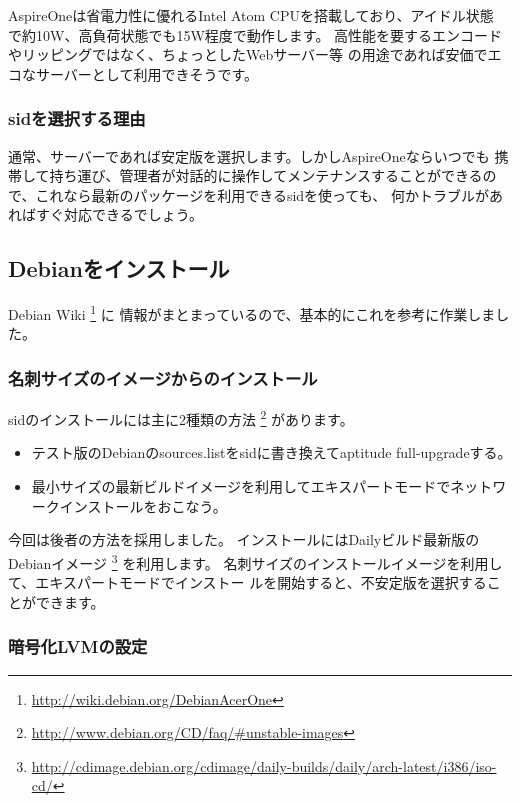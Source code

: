 \documentclass[mingoth,a4paper]{jsarticle}
\begin{document}
AspireOneは省電力性に優れるIntel Atom CPUを搭載しており、アイドル状態
で約10W、高負荷状態でも15W程度で動作します。
高性能を要するエンコードやリッピングではなく、ちょっとしたWebサーバー等
の用途であれば安価でエコなサーバーとして利用できそうです。

\subsubsection{sidを選択する理由}

通常、サーバーであれば安定版を選択します。しかしAspireOneならいつでも
携帯して持ち運び、管理者が対話的に操作してメンテナンスすることができるの
で、これなら最新のパッケージを利用できるsidを使っても、
何かトラブルがあればすぐ対応できるでしょう。

\subsection{Debianをインストール}

Debian Wiki \footnote{\url{http://wiki.debian.org/DebianAcerOne}} に
情報がまとまっているので、基本的にこれを参考に作業しました。

\subsubsection{名刺サイズのイメージからのインストール}

sidのインストールには主に2種類の方法
\footnote{\url{http://www.debian.org/CD/faq/\#unstable-images}} があります。
\begin{itemize}
 \item テスト版のDebianのsources.listをsidに書き換えてaptitude full-upgradeする。
 \item 最小サイズの最新ビルドイメージを利用してエキスパートモードでネットワークインストールをおこなう。
\end{itemize}

今回は後者の方法を採用しました。
インストールにはDailyビルド最新版のDebianイメージ 
\footnote{\url{http://cdimage.debian.org/cdimage/daily-builds/daily/arch-latest/i386/iso-cd/}} 
を利用します。
名刺サイズのインストールイメージを利用して、エキスパートモードでインストー
ルを開始すると、不安定版を選択することができます。

\subsubsection{暗号化LVMの設定}
\end{document}
